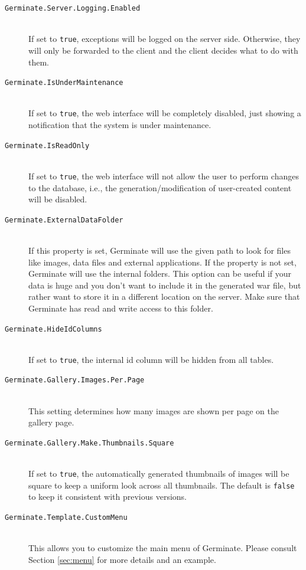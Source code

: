 \begin{description}
    \item[\texttt{Germinate.Server.Logging.Enabled}] \\If set to \texttt{true}, exceptions will be logged on the server side. Otherwise, they will only be forwarded to the client and the client decides what to do with them.
    \item[\texttt{Germinate.IsUnderMaintenance}] \\If set to \texttt{true}, the web interface will be completely disabled, just showing a notification that the system is under maintenance.
    \item[\texttt{Germinate.IsReadOnly}] \\If set to \texttt{true}, the web interface will not allow the user to perform changes to the database, i.e., the generation/modification of user-created content will be disabled.
    \item[\texttt{Germinate.ExternalDataFolder}\nonoptionalif] \floatright{[Path]}\\If this property is set, Germinate will use the given path to look for files like images, data files and external applications. If the property is not set, Germinate will use the internal folders. This option can be useful if your data is huge and you don't want to include it in the generated war file, but rather want to store it in a different location on the server. Make sure that Germinate has read and write access to this folder.
    \item[\texttt{Germinate.HideIdColumns}] \\
    If set to \texttt{true}, the internal id column will be hidden from all tables.
    \item[\texttt{Germinate.Gallery.Images.Per.Page}] \\This setting determines how many images are shown per page on the gallery page.
    \item[\texttt{Germinate.Gallery.Make.Thumbnails.Square}] \\If set to \texttt{true}, the automatically generated thumbnails of images will be square to keep a uniform look across all thumbnails. The default is \texttt{false} to keep it consistent with previous versions.
    \item[\texttt{Germinate.Template.CustomMenu}] \floatright{[XML]}\\This allows you to customize the main menu of Germinate. Please consult Section \ref{sec:menu} for more details and an example.

\end{description}
